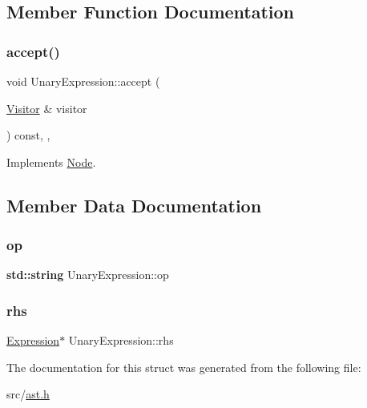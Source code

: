 \subsection{Member Function Documentation}
\mbox{\label{struct_unary_expression_a88c89a0268ecfa5008b5afe7bc47913a}} 
\subsubsection{\texorpdfstring{accept()}{accept()}}
{\footnotesize\ttfamily void Unary\+Expression\+::accept (\begin{DoxyParamCaption}\item[{\hyperlink{struct_visitor}{Visitor} \&}]{visitor }\end{DoxyParamCaption}) const\hspace{0.3cm}{\ttfamily [inline]}, {\ttfamily [override]}, {\ttfamily [virtual]}}



Implements \hyperlink{struct_node_a10bd7af968140bbf5fa461298a969c71}{Node}.



\subsection{Member Data Documentation}
\mbox{\label{struct_unary_expression_a057cfd54844d5b36e15f16ee5272b071}} 
\subsubsection{\texorpdfstring{op}{op}}
{\footnotesize\ttfamily \textbf{ std\+::string} Unary\+Expression\+::op}

\mbox{\label{struct_unary_expression_a53e53c6c0a0b76c46cb49a1fa48be5a5}} 
\subsubsection{\texorpdfstring{rhs}{rhs}}
{\footnotesize\ttfamily \hyperlink{struct_expression}{Expression}$\ast$ Unary\+Expression\+::rhs}



The documentation for this struct was generated from the following file\+:\begin{DoxyCompactItemize}
\item 
src/\hyperlink{ast_8h}{ast.\+h}\end{DoxyCompactItemize}
